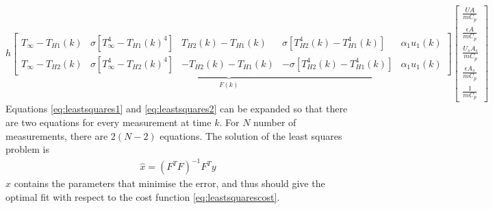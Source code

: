 \begin{equation}
        \underbrace{h\begin{bmatrix}
        T_{\infty} - T_{H1}(k) & \sigma[T_{\infty}^4 - T_{H1}(k)^4] & T_{H2}(k) - T_{H1}(k) & \sigma[T_{H2}^4(k) - T_{H1}^4(k)] & \alpha_1 u_1(k)\\
        T_{\infty} - T_{H2}(k) & \sigma[T_{\infty}^4 - T_{H2}(k)^4] & -T_{H2}(k) - T_{H1}(k) & -\sigma[T_{H2}^4(k) - T_{H1}^4(k)] & \alpha_1 u_1(k)       
    \end{bmatrix}}_{F(k)}
    \begin{bmatrix}
    \frac{UA}{mC_p} \\ \frac{\epsilon A}{mC_p} \\ \frac{U_sA_s}{mC_p} \\ \frac{\epsilon A_s}{mC_p} \\ \frac{1}{mC_p} \label{eq:leastsquares2}
    \end{bmatrix}
\end{equation}
Equations \ref{eq:leastsquares1} and \ref{eq:leastsquares2} can be expanded so that there are two equations for every measurement at time $k$. For $N$ number of measurements, there are $2(N-2)$ equations. The solution of the least squares problem is \cite[p.~28--32]{FilteringIdentification}
\begin{align}
    \hat{x} = (F^TF)^{-1}F^Ty
\end{align}
$\hat{x}$ contains the parameters that minimise the error, and thus should give the optimal fit with respect to the cost function \ref{eq:leastsquarescost}.

